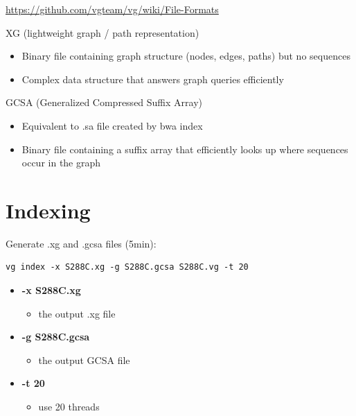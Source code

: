 \documentclass[
]{book}
\providecommand{\tightlist}{%
  \setlength{\itemsep}{0pt}\setlength{\parskip}{0pt}}
\begin{document}
\url{https://github.com/vgteam/vg/wiki/File-Formats}

XG (lightweight graph / path representation)

\begin{itemize}
\tightlist
\item
  Binary file containing graph structure (nodes, edges, paths) but no sequences
\item
  Complex data structure that answers graph queries efficiently
\end{itemize}

GCSA (Generalized Compressed Suffix Array)

\begin{itemize}
\tightlist
\item
  Equivalent to .sa file created by bwa index
\item
  Binary file containing a suffix array that efficiently looks up where sequences occur in the graph
\end{itemize}

\hypertarget{indexing}{%
\section{Indexing}\label{indexing}}

Generate .xg and .gcsa files (5min):

\begin{verbatim}
vg index -x S288C.xg -g S288C.gcsa S288C.vg -t 20
\end{verbatim}

\begin{itemize}
\tightlist
\item
  \textbf{-x S288C.xg}

  \begin{itemize}
  \tightlist
  \item
    the output .xg file
  \end{itemize}
\item
  \textbf{-g S288C.gcsa}

  \begin{itemize}
  \tightlist
  \item
    the output GCSA file
  \end{itemize}
\item
  \textbf{-t 20}

  \begin{itemize}
  \tightlist
  \item
    use 20 threads
  \end{itemize}
\end{itemize}
\end{document}
